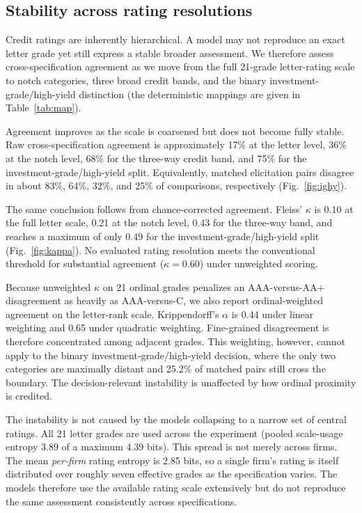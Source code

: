 \documentclass[a4paper,fleqn]{cas-sc}
\begin{document}
\subsection{Stability across rating resolutions}
Credit ratings are inherently hierarchical. A model may not reproduce an exact letter grade yet still
express a stable broader assessment. We therefore assess cross-specification agreement as we move from
the full 21-grade letter-rating scale to notch categories, three broad credit bands, and the binary
investment-grade/high-yield distinction (the deterministic mappings are given in Table~\ref{tab:map}).

Agreement improves as the scale is coarsened but does not become fully stable. Raw cross-specification
agreement is approximately 17\% at the letter level, 36\% at the notch level, 68\% for the three-way
credit band, and 75\% for the investment-grade/high-yield split. Equivalently, matched elicitation pairs
disagree in about 83\%, 64\%, 32\%, and 25\% of comparisons, respectively (Fig.~\ref{fig:ighy}).

The same conclusion follows from chance-corrected agreement. Fleiss' $\kappa$ is 0.10 at the full letter
scale, 0.21 at the notch level, 0.43 for the three-way band, and reaches a maximum of only 0.49 for the
investment-grade/high-yield split (Fig.~\ref{fig:kappa}). No evaluated rating resolution meets the
conventional threshold for substantial agreement ($\kappa=0.60$) under unweighted scoring.

Because unweighted $\kappa$ on 21 ordinal grades penalizes an AAA-versus-AA$+$ disagreement as heavily
as AAA-versus-C, we also report ordinal-weighted agreement on the letter-rank scale. Krippendorff's
$\alpha$ is 0.44 under linear weighting and 0.65 under quadratic weighting. Fine-grained disagreement is
therefore concentrated among adjacent grades. This weighting, however, cannot apply to the binary
investment-grade/high-yield decision, where the only two categories are maximally distant and 25.2\% of
matched pairs still cross the boundary. The decision-relevant instability is unaffected by how ordinal
proximity is credited.

The instability is not caused by the models collapsing to a narrow set of central ratings. All 21 letter
grades are used across the experiment (pooled scale-usage entropy 3.89 of a maximum 4.39 bits). This
spread is not merely across firms. The mean \emph{per-firm} rating entropy is 2.85 bits, so a single
firm's rating is itself distributed over roughly seven effective grades as the specification varies. The
models therefore use the available rating scale extensively but do not reproduce the same assessment
consistently across specifications.
\end{document}
